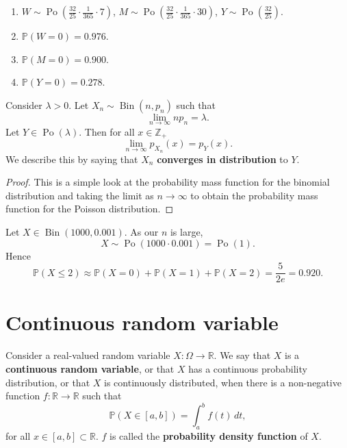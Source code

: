 \begin{solution}
    \begin{enumerate}
        \item $W \sim \operatorname{Po}\left(\frac{32}{25} \cdot \frac{1}{365} \cdot 7\right)$, $M \sim \operatorname{Po}\left(\frac{32}{25} \cdot \frac{1}{365} \cdot 30\right)$, $Y \sim \operatorname{Po}\left(\frac{32}{25}\right)$.
        \item $\mathbb P(W = 0) = 0.976$.
        \item $\mathbb P(M = 0) = 0.900$.
        \item $\mathbb P(Y = 0) = 0.278$.
    \end{enumerate}
\end{solution}

\begin{theorem}
    Consider $\lambda > 0$. Let $X_n \sim \operatorname{Bin}(n, p_n)$ such that \[ \lim_{n \to \infty} n p_n = \lambda. \] Let $Y \in \operatorname{Po}(\lambda)$. Then for all $x \in \mathbb Z_+$ \[ \lim_{n \to \infty} p_{X_n}(x) = p_Y(x). \] We describe this by saying that $X_n$ \textbf{converges in distribution} to $Y$.
\end{theorem}

\begin{proof}
    This is a simple look at the probability mass function for the binomial distribution and taking the limit as $n \to \infty$ to obtain the probability mass function for the Poisson distribution.
\end{proof}

\begin{example}
    Let $X \in \operatorname{Bin}(1000, 0.001)$. As our $n$ is large, \[ X \sim \operatorname{Po}(1000 \cdot 0.001) = \operatorname{Po}(1). \] Hence \[ \mathbb P(X \leq 2) \approx \mathbb P (X = 0) + \mathbb P(X = 1) + \mathbb P(X = 2) = \frac{5}{2e} = 0.920. \]
\end{example}

\section{Continuous random variable}

\begin{definition} 
    Consider a real-valued random variable $X : \Omega \to \mathbb R$. We say that $X$ is a \textbf{continuous random variable}, or that $X$ has a continuous probability distribution, or that $X$ is continuously distributed, when there is a non-negative function $f: \mathbb R \to \mathbb R$ such that \[ \mathbb P(X \in [a, b]) = \int_a^b f(t) \, dt, \] for all $x \in [a, b] \subset \mathbb R$. $f$ is called the \textbf{probability density function} of $X$.
\end{definition}

